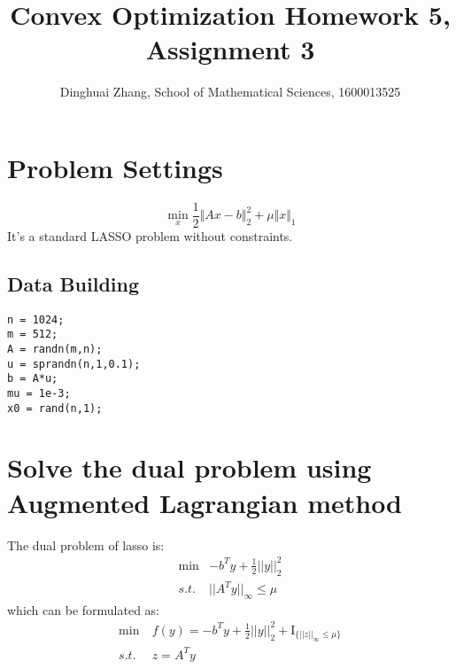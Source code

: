 \documentclass[11pt, oneside]{article}   	%
\title{Convex Optimization Homework 5, Assignment 3}
\author{Dinghuai Zhang, School of Mathematical Sciences, 1600013525}
\date{}							%
\begin{document}
\maketitle
\section{Problem Settings}
\begin{equation}
\min_x \frac{1}{2}\Vert Ax-b\Vert^2_2+\mu\Vert x\Vert_1
\end{equation}
It's a standard LASSO problem without constraints.
\subsection{Data Building}
\lstset{
 frame=single, 
breaklines=true,
language=MATLAB,
 }
\begin{lstlisting}
n = 1024;
m = 512;
A = randn(m,n);
u = sprandn(n,1,0.1);
b = A*u;
mu = 1e-3;
x0 = rand(n,1);
\end{lstlisting}

\section{Solve the dual problem using Augmented Lagrangian method}
The dual problem of lasso is:
\begin{align}
\min & -b^Ty+\frac{1}{2}||y||^2_2 \\
s.t. & ||A^Ty||_{\infty}\le \mu
\end{align}
which can be formulated as:
\begin{align}
\min &\ f(y) = -b^Ty+\frac{1}{2}||y||^2_2 + \textrm{I}_{\{||z||_{\infty}\le\mu\}}\\
s.t. &  \ z = A^Ty
\end{align}
\end{document}
